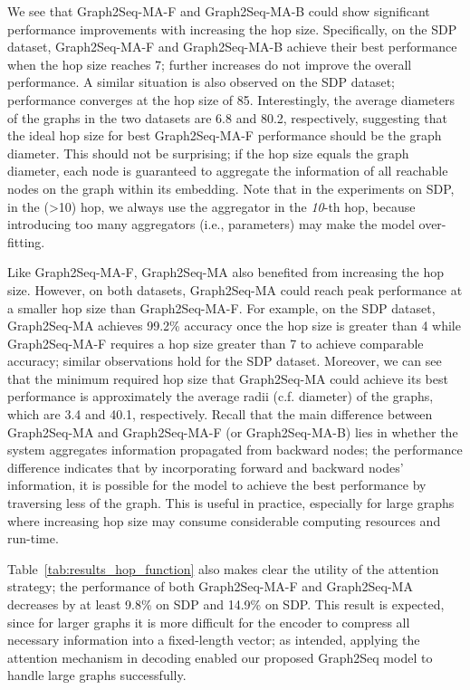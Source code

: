 \documentclass{article} \usepackage{iclr2019_conference,times}
\begin{document}
We see that Graph2Seq-MA-F and Graph2Seq-MA-B could show significant performance improvements with increasing the hop size.
Specifically, on the SDP dataset, Graph2Seq-MA-F and Graph2Seq-MA-B achieve their best performance when the hop size reaches 7; further increases do not improve the overall performance.
A similar situation is also observed on the SDP dataset; performance converges at the hop size of 85.
Interestingly, the average diameters of the graphs in the two datasets are 6.8 and 80.2, respectively, suggesting that the ideal hop size for best Graph2Seq-MA-F performance should be the graph diameter. This should not be surprising; if the hop size equals the graph diameter,
each node is guaranteed to aggregate the information of all reachable nodes on the graph within its embedding. Note that in the experiments on SDP, in the  (>10) hop, we always use the aggregator in the \textit{10}-th hop, because introducing too many aggregators (i.e., parameters) may make the model over-fitting.

Like Graph2Seq-MA-F, Graph2Seq-MA also benefited from increasing the hop size. However, on both datasets, Graph2Seq-MA could reach peak performance at a smaller hop size than Graph2Seq-MA-F. For example, on the SDP dataset, Graph2Seq-MA achieves 99.2\% accuracy once the hop size is greater than 4 while Graph2Seq-MA-F requires a hop size greater than 7 to achieve comparable accuracy; similar observations hold for the SDP dataset.
Moreover, we can see that the minimum required hop size that Graph2Seq-MA could achieve its best performance is approximately the average radii (c.f. diameter) of the graphs, which are 3.4 and 40.1, respectively.
Recall that the main difference between Graph2Seq-MA and Graph2Seq-MA-F (or Graph2Seq-MA-B) lies in whether the system aggregates information propagated from backward nodes; the performance difference indicates that by incorporating forward and backward nodes' information, it is possible for the model to achieve the best performance by traversing less of the graph. This is useful in practice, especially for large graphs where increasing hop size may consume considerable computing resources and run-time.

Table~\ref{tab:results_hop_function} also makes clear the utility of the attention strategy; the performance of both Graph2Seq-MA-F and Graph2Seq-MA decreases by at least 9.8\% on SDP and 14.9\% on SDP. This result is expected, since for larger graphs it is more difficult for the encoder to compress all necessary information into a fixed-length vector; as intended, applying the attention mechanism in decoding enabled our proposed Graph2Seq model to handle large graphs successfully.
\end{document}
